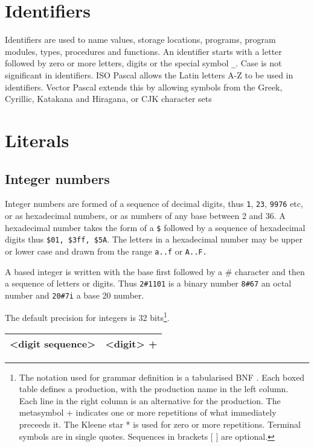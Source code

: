 \section{Identifiers}

Identifiers are used to name values, storage locations, programs, program modules,
types, procedures and functions. An identifier starts with
a letter followed by zero or more letters, digits or the special symbol \texttt{\_}.
Case is not significant in identifiers.
ISO Pascal allows the Latin letters A-Z   to be used in identifiers. 
Vector Pascal extends this by allowing symbols from the Greek, 
Cyrillic, Katakana and Hiragana, or CJK character sets

 

\section{Literals}


\subsection{Integer numbers}

Integer numbers are formed of a sequence of decimal digits, thus \texttt{1},
\texttt{23}, \texttt{9976} etc, or as hexadecimal numbers,
or as numbers of any base between 2 and 36. A hexadecimal number takes the form
of a \texttt{\$} followed by a sequence of hexadecimal digits thus \texttt{\$01,
\$3ff, \$5A}. The letters in a hexadecimal number may be upper or lower case
and drawn from the range \texttt{a..f} or \texttt{A..F. }

A based integer is written with the base first followed by a
\# character and then a sequence of letters or digits. Thus \texttt{2\#1101}
is a binary number \texttt{8\#67} an octal number and \texttt{20\#7i}
a base 20 number.

The default precision for integers is 32 bits\footnote{%
The notation used for grammar definition is a tabularised BNF . Each boxed table
defines a production, with the production name in the left column. Each line
in the right column is an alternative for the production. The metasymbol + indicates
one or more repetitions of what immediately preceeds it. The Kleene star {*}
is used for zero or more repetitions. Terminal symbols are in single quotes.
Sequences in brackets {[} {]} are optional.
}.

\vspace{0.3cm}
{\centering \begin{tabular}{|c|c|}
\hline 
<digit sequence>&
<digit> +\\
\hline 
\end{tabular}\par}
\vspace{0.3cm}

